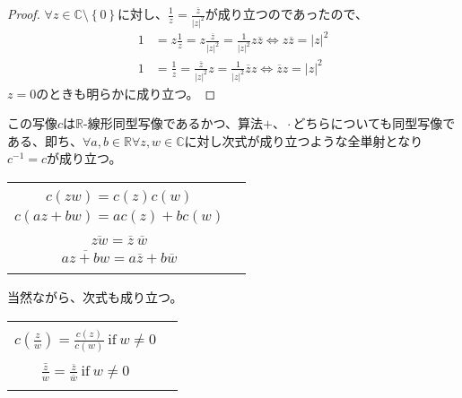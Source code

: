 \documentclass[dvipdfmx]{jsarticle}
\begin{document}
\begin{proof}
$\forall z \in \mathbb{C} \setminus \left\{ 0 \right\}$に対し、$\frac{1}{z} = \frac{\overline{z}}{|z|^{2}}$が成り立つのであったので、
\begin{align*}
1 &= z\frac{1}{z} = z\frac{\overline{z}}{|z|^{2}} = \frac{1}{|z|^{2}}z\overline{z} \Leftrightarrow z\overline{z} = |z|^{2}\\
1 &= \frac{1}{z} = \frac{\overline{z}}{|z|^{2}}z = \frac{1}{|z|^{2}}\overline{z}z \Leftrightarrow \overline{z}z = |z|^{2}
\end{align*}
$z = 0$のときも明らかに成り立つ。
\end{proof}
\begin{thm}\label{4.1.2.11}
この写像$c$は$\mathbb{R}$-線形同型写像であるかつ、算法$+ 、 \cdot$どちらについても同型写像である、即ち、$\forall a,b \in \mathbb{R}\forall z,w \in \mathbb{C}$に対し次式が成り立つような全単射となり$c^{- 1} = c$が成り立つ。
\begin{longtable}[c]{cc}
\hspace{-0.5em}\begin{tabular}{c}
  $c(z + w) = c(z) + c(w)$\\
  $c(zw) = c(z)c(w)$\\
  $c(az + bw) = ac(z) + bc(w)$\\
\end{tabular} & \hspace{-0.5em}\begin{tabular}{c}
  $\overline{z + w} = \overline{z} + \overline{w}$\\
  $\overline{zw} = \overline{z}\ \overline{w}$\\
  $\overline{az + bw} = a\overline{z} + b\overline{w}$\\
\end{tabular} \\
\end{longtable}
当然ながら、次式も成り立つ。
\begin{longtable}[c]{cc}
\hspace{-0.5em}\begin{tabular}{c}
  $c(z - w) = c(z) - c(w)$\\
  $c\left( \frac{z}{w} \right) = \frac{c(z)}{c(w)}\ \mathrm{if}\ w \neq 0$\\
\end{tabular} & \hspace{-0.5em}\begin{tabular}{c}
  $\overline{z - w} = \overline{z} - \overline{w}$\\
  $\overline{\frac{z}{w}} = \frac{\overline{z}}{\overline{w}}\ \mathrm{if}\ w \neq 0$\\
\end{tabular} \\
\end{longtable}
\end{thm}
\end{document}
